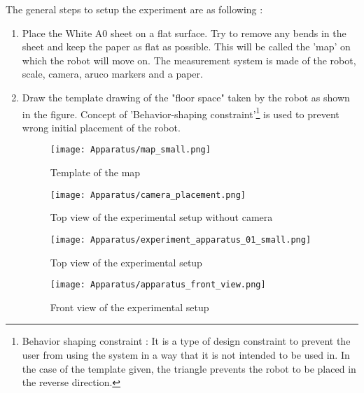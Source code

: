 \documentclass[10pt,a4paper]{article}
\begin{document}
The general steps to setup the experiment are as following :
\begin{enumerate}
    \item
    Place the White A0 sheet on a flat surface.  Try to remove any bends in the sheet and keep the paper as flat as possible. This will be called the 'map' on which the robot will move on. The measurement system is made of the robot, scale, camera, aruco markers and a paper. 
    \item
    Draw the template drawing of the "floor space" taken by the robot as shown in the figure. Concept of 'Behavior-shaping constraint'\footnote{Behavior shaping constraint : It is a type of design constraint to prevent the user from using the system in a way that it is not intended to be used in. In the case of the template given, the triangle prevents the robot to be placed in the reverse direction.} is used to prevent wrong initial placement of the robot.
    
    
    \begin{figure}[H]
	\centering
    \texttt{[image: Apparatus/map\_small.png]}
    \caption{ Template of the map}
    \end{figure}    
      
    \begin{figure}[H]
    	\centering
    	\texttt{[image: Apparatus/camera\_placement.png]}
    	\caption{Top view of the experimental setup without camera}
    \end{figure}
    
    \begin{figure}[H]
    	\centering
    	\texttt{[image: Apparatus/experiment\_apparatus\_01\_small.png]}
    	\caption{Top view of the experimental setup}
    \end{figure}
    
    \begin{figure}[H]
     	\centering
     	\texttt{[image: Apparatus/apparatus\_front\_view.png]}
     	\caption{Front view of the experimental setup}
    \end{figure}
    

\end{enumerate}
\end{document}
